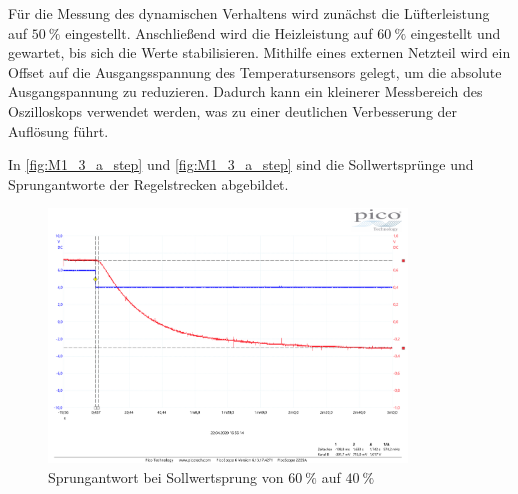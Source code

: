 

Für die Messung des dynamischen Verhaltens wird zunächst die Lüfterleistung auf \( \SI{50}{\percent} \) eingestellt. Anschließend wird die Heizleistung auf \( \SI{60}{\percent} \) eingestellt und gewartet, bis sich die Werte stabilisieren. Mithilfe eines externen Netzteil wird ein Offset auf die Ausgangsspannung des Temperatursensors gelegt, um die absolute Ausgangspannung zu reduzieren. Dadurch kann ein kleinerer Messbereich des Oszilloskops verwendet werden, was zu einer deutlichen Verbesserung der Auflösung führt.

In \autoref{fig:M1_3_a_step} und \autoref{fig:M1_3_a_step} sind die Sollwertsprünge und Sprungantworte der Regelstrecken abgebildet.

\newpage

\begin{figure}[H]
    \begin{center}
        \includegraphics[width=0.85\textwidth]{pdf_ext/anlage5_messung1_u_uP_60_40.pdf}
        \caption{Sprungantwort bei Sollwertsprung von \( \SI{60}{\percent} \) auf \( \SI{40}{\percent} \)}
        \label{fig:M1_3_a_step}
    \end{center}
\end{figure}

